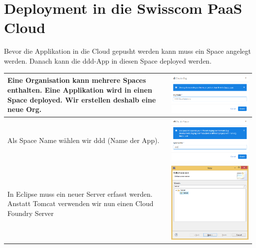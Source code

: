 \section{Deployment in die Swisscom PaaS Cloud}
Bevor die Applikation in die Cloud gepusht werden kann muss ein Space angelegt werden. Danach kann die ddd-App in diesen Space deployed werden.
\begin{longtable}{| p{5cm} | p{11cm} |}
\hline
Eine Organisation kann mehrere Spaces enthalten. Eine Applikation wird in einen Space deployed. Wir erstellen deshalb eine neue Org.
&\includegraphics[width=0.65\columnwidth, valign=T]{images/swisscom_create_space/1.png}
 \\ \hline
Als Space Name wählen wir ddd (Name der App).
&\includegraphics[width=0.65\columnwidth, valign=T]{images/swisscom_create_space/2.png}
 \\ \hline
In Eclipse muss ein neuer Server erfasst werden. Anstatt Tomcat verwenden wir nun einen Cloud Foundry Server
&\includegraphics[width=0.65\columnwidth, valign=T]{images/ddd_cloud_deployment/1.png}

\end{longtable}
